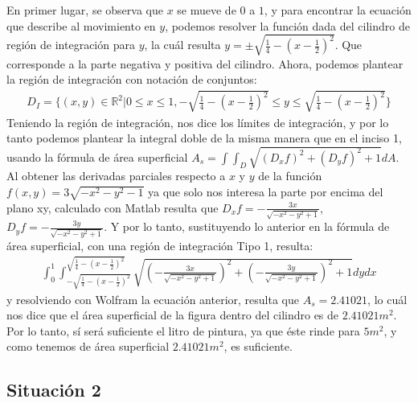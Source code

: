 \documentclass[12pt, letterpaper]{report}
\begin{document}
\begin{enumerate}
En primer lugar, se observa que $x$ se mueve de $0$ a $1$, y para encontrar la ecuación que describe al movimiento en $y$, 
podemos resolver la función dada del cilindro de región de integración para $y$, la cuál resulta $y = \pm \sqrt{\frac{1}{4} - (x-\frac{1}{2})^2}$. Que 
corresponde a la parte negativa y positiva del cilindro. Ahora, podemos plantear la región de integración con notación de conjuntos: 
\begin{align}
D_I = \{ (x, y) \in \mathbb{R}^2 | 0 \leq x \leq 1,-\sqrt{\frac{1}{4} - (x-\frac{1}{2})^2} \leq y \leq \sqrt{\frac{1}{4} - (x-\frac{1}{2})^2} \} 
\end{align}
Teniendo la región de integración, nos dice los límites de integración, y por lo tanto podemos plantear la integral doble de la misma manera que en el inciso 1, usando la fórmula de 
área superficial $A_s = \int\int_D \sqrt{(D_xf)^2 + (D_yf)^2 + 1}dA$. Al obtener las derivadas parciales respecto a $x$ y $y$ de la función $f(x, y) = 3\sqrt{-x^2 -y^2 -1}$ ya que solo 
nos interesa la parte por encima del plano xy, calculado con Matlab resulta que $D_xf = -\frac{3x}{\sqrt{-x^2-y^2+1}}$, $D_yf = -\frac{3y}{\sqrt{-x^2-y^2+1}}$. Y por lo tanto, sustituyendo lo anterior 
en la fórmula de área superficial, con una región de integración Tipo 1, resulta:
\begin{align}
\int_{0}^{1} \int_{-\sqrt{\frac{1}{4} - (x-\frac{1}{2})^2}}^{\sqrt{\frac{1}{4} - (x-\frac{1}{2})^2}} \sqrt{(-\frac{3x}{\sqrt{-x^2-y^2+1}})^2+(-\frac{3y}{\sqrt{-x^2-y^2+1}})^2 +1}dydx
\end{align}
y resolviendo con Wolfram la ecuación anterior, resulta que $A_s = 2.41021$, lo cuál nos dice que el área superficial de la figura dentro del cilindro es de $2.41021 m^2$. Por lo tanto, 
sí será suficiente el litro de pintura, ya que éste rinde para $5m^2$, y como tenemos de área superficial $2.41021m^2$, es suficiente. 
\end{enumerate}

\subsection*{Situación 2}
\end{document}
